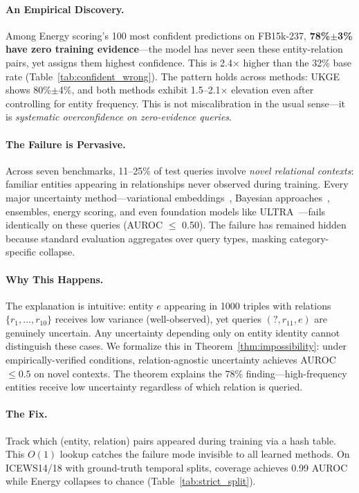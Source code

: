 
\paragraph{An Empirical Discovery.}
Among Energy scoring's 100 most confident predictions on FB15k-237, \textbf{78\%$\pm$3\% have zero training evidence}---the model has never seen these entity-relation pairs, yet assigns them highest confidence. This is 2.4$\times$ higher than the 32\% base rate (Table~\ref{tab:confident_wrong}). The pattern holds across methods: UKGE shows 80\%$\pm$4\%, and both methods exhibit 1.5--2.1$\times$ elevation even after controlling for entity frequency. This is not miscalibration in the usual sense---it is \emph{systematic overconfidence on zero-evidence queries}.

\paragraph{The Failure is Pervasive.}
Across seven benchmarks, 11--25\% of test queries involve \emph{novel relational contexts}: familiar entities appearing in relationships never observed during training. Every major uncertainty method---variational embeddings~\citep{chen2019embedding,chen2021probabilistic}, Bayesian approaches~\citep{choudhary2021perm}, ensembles, energy scoring, and even foundation models like ULTRA~\citep{galkin2024ultra}---fails identically on these queries (AUROC $\leq$ 0.50). The failure has remained hidden because standard evaluation aggregates over query types, masking category-specific collapse.

\paragraph{Why This Happens.}
The explanation is intuitive: entity $e$ appearing in 1000 triples with relations $\{r_1, \ldots, r_{10}\}$ receives low variance (well-observed), yet queries $(?, r_{11}, e)$ are genuinely uncertain. Any uncertainty depending only on entity identity cannot distinguish these cases. We formalize this in Theorem~\ref{thm:impossibility}: under empirically-verified conditions, relation-agnostic uncertainty achieves AUROC $\leq 0.5$ on novel contexts. The theorem explains the 78\% finding---high-frequency entities receive low uncertainty regardless of which relation is queried.

\paragraph{The Fix.}
Track which (entity, relation) pairs appeared during training via a hash table. This $O(1)$ lookup catches the failure mode invisible to all learned methods. On ICEWS14/18 with ground-truth temporal splits, coverage achieves 0.99 AUROC while Energy collapses to chance (Table~\ref{tab:strict_split}).

